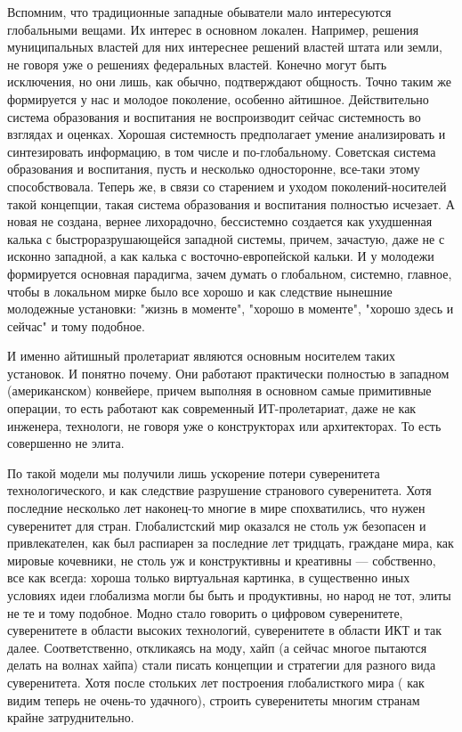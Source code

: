 \begin{partbacktext}
Вспомним, что традиционные западные обыватели мало интересуются глобальными вещами. Их интерес в основном локален. Например, решения муниципальных властей для них интереснее решений властей штата или земли, не говоря уже о решениях федеральных властей. Конечно могут быть исключения, но они лишь, как обычно, подтверждают общность. Точно таким же формируется у нас и молодое поколение, особенно айтишное. Действительно система образования и воспитания не воспроизводит сейчас системность во взглядах и оценках. Хорошая системность предполагает умение анализировать и синтезировать информацию, в том числе и по-глобальному. Советская система образования и воспитания, пусть и несколько односторонне, все-таки этому способствовала. Теперь же, в связи со старением и уходом поколений-носителей такой концепции, такая система образования и воспитания полностью исчезает. А новая не создана, вернее лихорадочно, бессистемно создается как ухудшенная калька с быстроразрушающейся западной системы, причем, зачастую, даже не с исконно западной, а как калька с восточно-европейской  кальки. И у молодежи формируется основная парадигма, зачем думать о глобальном, системно, главное, чтобы в локальном мирке было все хорошо и как следствие нынешние молодежные установки: "жизнь в моменте"{}, "хорошо в моменте"{}, "хорошо здесь и сейчас"{} и тому подобное.

И именно айтишный пролетариат являются основным носителем таких установок.  И понятно почему. Они работают практически полностью в западном (американском) конвейере, причем выполняя в основном самые примитивные операции, то есть работают как современный ИТ-пролетариат, даже не как инженера, технологи, не говоря уже о конструкторах или архитекторах. То есть совершенно не элита.

По такой модели мы получили лишь ускорение потери суверенитета технологического, и как следствие разрушение странового суверенитета. 
Хотя последние несколько лет наконец-то многие в мире спохватились, что нужен суверенитет для стран. Глобалистский мир оказался не столь уж безопасен и привлекателен, как был распиарен за последние лет тридцать, граждане мира, как мировые кочевники, не столь уж и конструктивны и креативны --- собственно, все как всегда: хороша только виртуальная картинка,  в существенно иных условиях идеи глобализма могли бы быть и продуктивны, но народ не тот, элиты не те и тому подобное.  Модно стало говорить о цифровом суверенитете, суверенитете в области высоких технологий, суверенитете в области ИКТ и так далее. Соответственно, откликаясь на моду, хайп (а сейчас многое пытаются делать на волнах хайпа) стали писать концепции и стратегии для разного вида суверенитета. Хотя после стольких лет построения глобалисткого мира ( как видим теперь не очень-то  удачного),  строить суверенитеты многим странам крайне затруднительно.


\end{partbacktext}
